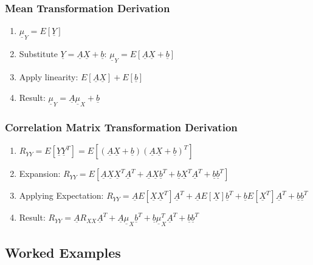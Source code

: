 \documentclass[12pt]{article}
\begin{document}
\subsubsection*{Mean Transformation Derivation}
\begin{enumerate}
    \item $\underline{\mu}_{Y} = E[\underline{Y}]$
    \item Substitute $\underline{Y} = \underline{A}\underline{X} + \underline{b}$: $\underline{\mu}_{Y} = E[\underline{A}\underline{X} + \underline{b}]$
    \item Apply linearity: $E[\underline{A}\underline{X}] + E[\underline{b}]$
    \item Result: $\underline{\mu}_{Y} = \underline{A}\underline{\mu}_{X} + \underline{b}$
\end{enumerate}

\subsubsection*{Correlation Matrix Transformation Derivation}
\begin{enumerate}
    \item $R_{YY} = E[\underline{Y}\underline{Y}^{T}] = E[(\underline{A}\underline{X} + \underline{b})(\underline{A}\underline{X} + \underline{b})^{T}]$
    \item Expansion: $R_{YY} = E[\underline{A}\underline{X}\underline{X}^{T}\underline{A}^{T} + \underline{A}\underline{X}\underline{b}^{T} + \underline{b}\underline{X}^{T}\underline{A}^{T} + \underline{b}\underline{b}^{T}]$
    \item Applying Expectation: $R_{YY} = \underline{A}E[\underline{X}\underline{X}^{T}]\underline{A}^{T} + \underline{A}E[\underline{X}]\underline{b}^{T} + \underline{b}E[\underline{X}^{T}]\underline{A}^{T} + \underline{b}\underline{b}^{T}$
    \item Result: $R_{YY} = \underline{A}R_{XX}\underline{A}^{T} + \underline{A}\underline{\mu}_{X}\underline{b}^{T} + \underline{b}\underline{\mu}_{X}^{T}\underline{A}^{T} + \underline{b}\underline{b}^{T}$
\end{enumerate}

\subsection{Worked Examples}
\end{document}
